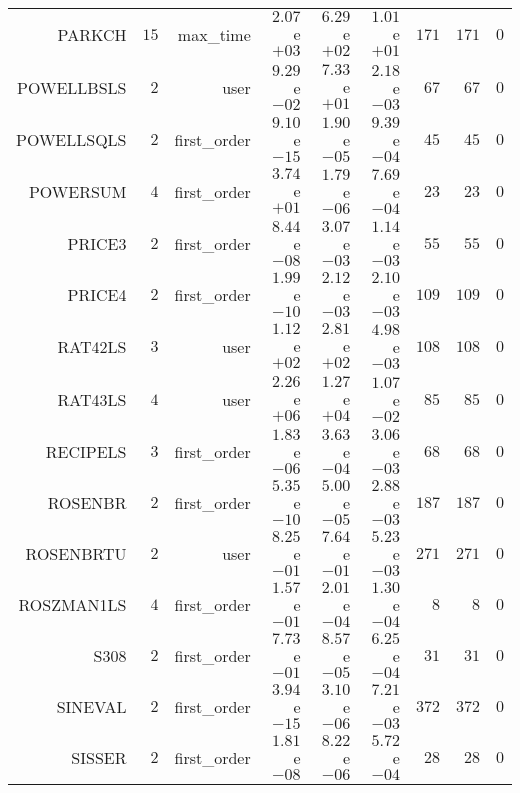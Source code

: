 \begin{longtable}{rrrrrrrrr}
PARKCH & \(    15\) & max\_time & \( 2.07\)e\(+03\) & \( 6.29\)e\(+02\) & \( 1.01\)e\(+01\) & \(   171\) & \(   171\) & \(     0\) \\
POWELLBSLS & \(     2\) & user & \( 9.29\)e\(-02\) & \( 7.33\)e\(+01\) & \( 2.18\)e\(-03\) & \(    67\) & \(    67\) & \(     0\) \\
POWELLSQLS & \(     2\) & first\_order & \( 9.10\)e\(-15\) & \( 1.90\)e\(-05\) & \( 9.39\)e\(-04\) & \(    45\) & \(    45\) & \(     0\) \\
POWERSUM & \(     4\) & first\_order & \( 3.74\)e\(+01\) & \( 1.79\)e\(-06\) & \( 7.69\)e\(-04\) & \(    23\) & \(    23\) & \(     0\) \\
PRICE3 & \(     2\) & first\_order & \( 8.44\)e\(-08\) & \( 3.07\)e\(-03\) & \( 1.14\)e\(-03\) & \(    55\) & \(    55\) & \(     0\) \\
PRICE4 & \(     2\) & first\_order & \( 1.99\)e\(-10\) & \( 2.12\)e\(-03\) & \( 2.10\)e\(-03\) & \(   109\) & \(   109\) & \(     0\) \\
RAT42LS & \(     3\) & user & \( 1.12\)e\(+02\) & \( 2.81\)e\(+02\) & \( 4.98\)e\(-03\) & \(   108\) & \(   108\) & \(     0\) \\
RAT43LS & \(     4\) & user & \( 2.26\)e\(+06\) & \( 1.27\)e\(+04\) & \( 1.07\)e\(-02\) & \(    85\) & \(    85\) & \(     0\) \\
RECIPELS & \(     3\) & first\_order & \( 1.83\)e\(-06\) & \( 3.63\)e\(-04\) & \( 3.06\)e\(-03\) & \(    68\) & \(    68\) & \(     0\) \\
ROSENBR & \(     2\) & first\_order & \( 5.35\)e\(-10\) & \( 5.00\)e\(-05\) & \( 2.88\)e\(-03\) & \(   187\) & \(   187\) & \(     0\) \\
ROSENBRTU & \(     2\) & user & \( 8.25\)e\(-01\) & \( 7.64\)e\(-01\) & \( 5.23\)e\(-03\) & \(   271\) & \(   271\) & \(     0\) \\
ROSZMAN1LS & \(     4\) & first\_order & \( 1.57\)e\(-01\) & \( 2.01\)e\(-04\) & \( 1.30\)e\(-04\) & \(     8\) & \(     8\) & \(     0\) \\
S308 & \(     2\) & first\_order & \( 7.73\)e\(-01\) & \( 8.57\)e\(-05\) & \( 6.25\)e\(-04\) & \(    31\) & \(    31\) & \(     0\) \\
SINEVAL & \(     2\) & first\_order & \( 3.94\)e\(-15\) & \( 3.10\)e\(-06\) & \( 7.21\)e\(-03\) & \(   372\) & \(   372\) & \(     0\) \\
SISSER & \(     2\) & first\_order & \( 1.81\)e\(-08\) & \( 8.22\)e\(-06\) & \( 5.72\)e\(-04\) & \(    28\) & \(    28\) & \(     0\) \\

\end{longtable}
